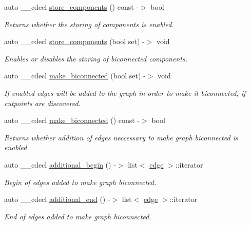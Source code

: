\begin{DoxyCompactItemize}
auto \+\_\+\+\_\+cdecl \mbox{\hyperlink{classbiconnectivity_a40e723d97cd42613470ab38baed18c78}{store\+\_\+components}} () const -\/$>$ bool
\begin{DoxyCompactList}\small\item\em Returns whether the storing of components is enabled. \end{DoxyCompactList}\item 
auto \+\_\+\+\_\+cdecl \mbox{\hyperlink{classbiconnectivity_a85a107ff0a60722c48333b252ace0040}{store\+\_\+components}} (bool set) -\/$>$ void
\begin{DoxyCompactList}\small\item\em Enables or disables the storing of biconnected components. \end{DoxyCompactList}\item 
auto \+\_\+\+\_\+cdecl \mbox{\hyperlink{classbiconnectivity_a58014d7166628862c2bb064624b9a888}{make\+\_\+biconnected}} (bool set) -\/$>$ void
\begin{DoxyCompactList}\small\item\em If enabled edges will be added to the graph in order to make it biconnected, if cutpoints are discovered. \end{DoxyCompactList}\item 
auto \+\_\+\+\_\+cdecl \mbox{\hyperlink{classbiconnectivity_afc9429b42767ea006ed2bf7f9bee35ff}{make\+\_\+biconnected}} () const -\/$>$ bool
\begin{DoxyCompactList}\small\item\em Returns whether addition of edges neccessary to make graph biconnected is enabled. \end{DoxyCompactList}\item 
auto \+\_\+\+\_\+cdecl \mbox{\hyperlink{classbiconnectivity_a896398c41cf0c84714b4cc7475aafc6e}{additional\+\_\+begin}} () -\/$>$ list$<$ \mbox{\hyperlink{classedge}{edge}} $>$\+::iterator
\begin{DoxyCompactList}\small\item\em Begin of edges added to make graph biconnected. \end{DoxyCompactList}\item 
auto \+\_\+\+\_\+cdecl \mbox{\hyperlink{classbiconnectivity_a8efa922c941f73613a3083fbd3e9b5df}{additional\+\_\+end}} () -\/$>$ list$<$ \mbox{\hyperlink{classedge}{edge}} $>$\+::iterator
\begin{DoxyCompactList}\small\item\em End of edges added to make graph biconnected. \end{DoxyCompactList}\item 

\end{DoxyCompactItemize}
